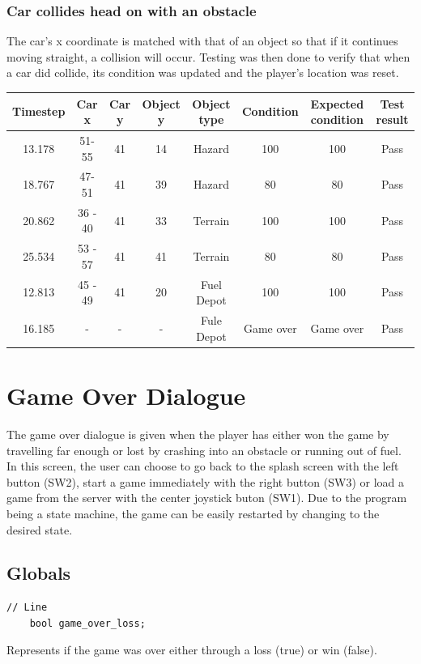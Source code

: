 \documentclass{article}
\begin{document}
\subsubsection*{Car collides head on with an obstacle} 
The car's x coordinate is matched with that of an object so that if it continues moving straight, a collision will occur. Testing was then done to verify that when a car did collide, its condition was updated and the player's location was reset. 
\begin{center}
\begin{tabular}{ c c c c c c c c }
Timestep	& Car x 	& Car y	& Object y	& Object type 	& Condition	& Expected condition	& Test result	\\ \hline
13.178	& 51-55	& 41		& 14		& Hazard		& 100		& 100				& Pass	\\
18.767	& 47-51	& 41		& 39		& Hazard		& 80		& 80				& Pass	\\
20.862	& 36 - 40	& 41		& 33		& Terrain		& 100		& 100				& Pass	\\
25.534	& 53 - 57	& 41		& 41		& Terrain		& 80		& 80				& Pass	\\
12.813	& 45 - 49	& 41		& 20		& Fuel Depot		& 100		& 100				& Pass	\\
16.185	& - 		& - 		& - 		& Fule Depot 	& Game over & Game over			& Pass	\\ \hline
\end{tabular}
\end{center}

\clearpage

\section{Game Over Dialogue}
The game over dialogue is given when the player has either won the game by travelling far enough or lost by crashing into an obstacle or running out of fuel. In this screen, the user can choose to go back to the splash screen with the left button (SW2), start a game immediately with the right button (SW3) or load a game from the server with the center joystick buton (SW1).
\newline
Due to the program being a state machine, the game can be easily restarted by changing to the desired state.

\subsection*{Globals}
\begin{lstlisting}[style=CStyle]
	// Line 
	bool game_over_loss;
\end{lstlisting}
Represents if the game was over either through a loss (true) or win (false).
\newline
\end{document}

